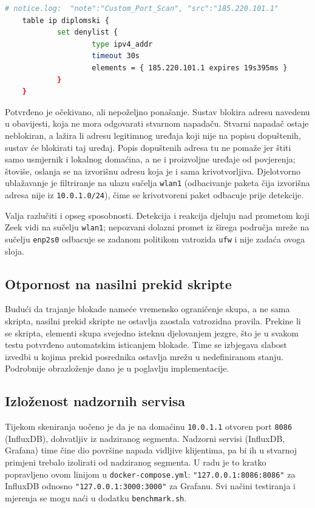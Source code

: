 \begin{lstlisting}[language=bash, caption={Ispis denylist}, label={lst:spoof}]
    # notice.log:  "note":"Custom_Port_Scan", "src":"185.220.101.1"
    table ip diplomski {
            set denylist {
                    type ipv4_addr
                    timeout 30s
                    elements = { 185.220.101.1 expires 19s395ms }
            }
    }
\end{lstlisting}

Potvrđeno je očekivano, ali nepoželjno ponašanje. Sustav blokira adresu navedenu u obavijesti, koja ne mora odgovarati stvarnom napadaču. Stvarni
napadač ostaje neblokiran, a lažira li adresu legitimnog uređaja koji nije na popisu dopuštenih, sustav će blokirati taj uređaj. Popis dopuštenih adresa
tu ne pomaže jer štiti samo usmjernik i lokalnog domaćina, a ne i proizvoljne uređaje od povjerenja; štoviše, oslanja se na izvorišnu adresu koja je i sama
krivotvorljiva. Djelotvorno ublažavanje je filtriranje na ulazu sučelja \texttt{wlan1} (odbacivanje paketa čija izvorišna adresa nije iz
\texttt{10.0.1.0/24}), čime se krivotvoreni paket odbacuje prije detekcije.

Valja razlučiti i opseg sposobnosti. Detekcija i reakcija djeluju nad prometom koji Zeek vidi na sučelju \texttt{wlan1}; nepozvani dolazni promet iz širega
područja mreže na sučelju \texttt{enp2s0} odbacuje se zadanom politikom vatrozida \texttt{ufw} i nije zadaća ovoga sloja.

\subsection{Otpornost na nasilni prekid skripte}

Budući da trajanje blokade nameće vremensko ograničenje skupa, a ne sama skripta, nasilni prekid skripte ne ostavlja zaostala vatrozidna pravila.
Prekine li se skripta, elementi skupa svejedno isteknu djelovanjem jezgre, što je u svakom testu potvrđeno automatskim isticanjem blokade. Time se izbjegava
slabost izvedbi u kojima prekid posrednika ostavlja mrežu u nedefiniranom stanju. Podrobnije obrazloženje dano je u poglavlju implementacije.

\subsection{Izloženost nadzornih servisa}

Tijekom skeniranja uočeno je da je na domaćinu \texttt{10.0.1.1} otvoren port \texttt{8086} (InfluxDB), dohvatljiv iz nadziranog segmenta. Nadzorni servisi
(InfluxDB, Grafana) time čine dio površine napada vidljive klijentima, pa bi ih u stvarnoj primjeni trebalo izolirati od nadziranog segmenta. U radu je to kratko
popravljeno ovom linijom u \texttt{docker-compose.yml}: \texttt{"127.0.0.1:8086:8086"} za InfluxDB odnosno \texttt{"127.0.0.1:3000:3000"} za Grafanu.
Svi načini testiranja i mjerenja se mogu naći u dodatku \texttt{benchmark.sh}.
